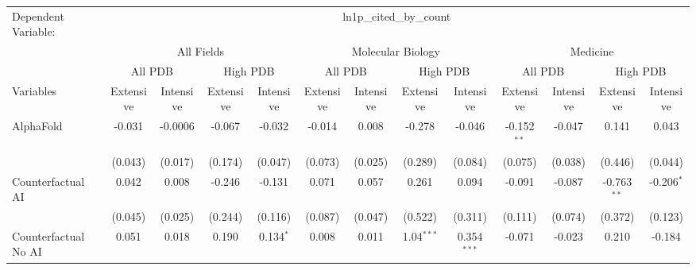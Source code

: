 \begingroup
\centering
\begin{tabular}{lcccccccccccc}
   \tabularnewline \midrule \midrule
   Dependent Variable: & \multicolumn{12}{c}{ln1p\_cited\_by\_count}\\
 & \multicolumn{4}{c}{All Fields} & \multicolumn{4}{c}{Molecular Biology} & \multicolumn{4}{c}{Medicine} \\
\cmidrule(lr){2-5} \cmidrule(lr){6-9} \cmidrule(lr){10-13}
 & \multicolumn{2}{c}{All PDB} & \multicolumn{2}{c}{High PDB} & \multicolumn{2}{c}{All PDB} & \multicolumn{2}{c}{High PDB} & \multicolumn{2}{c}{All PDB} & \multicolumn{2}{c}{High PDB} \\
\cmidrule(lr){2-3} \cmidrule(lr){4-5} \cmidrule(lr){6-7} \cmidrule(lr){8-9} \cmidrule(lr){10-11} \cmidrule(lr){12-13}
Variables & \multicolumn{1}{c}{Extensive} & \multicolumn{1}{c}{Intensive} & \multicolumn{1}{c}{Extensive} & \multicolumn{1}{c}{Intensive} & \multicolumn{1}{c}{Extensive} & \multicolumn{1}{c}{Intensive} & \multicolumn{1}{c}{Extensive} & \multicolumn{1}{c}{Intensive} & \multicolumn{1}{c}{Extensive} & \multicolumn{1}{c}{Intensive} & \multicolumn{1}{c}{Extensive} & \multicolumn{1}{c}{Intensive} \\
\cmidrule(lr){1-1}\cmidrule(lr){2-2} \cmidrule(lr){3-3} \cmidrule(lr){4-4} \cmidrule(lr){5-5} \cmidrule(lr){6-6} \cmidrule(lr){7-7} \cmidrule(lr){8-8} \cmidrule(lr){9-9} \cmidrule(lr){10-10} \cmidrule(lr){11-11} \cmidrule(lr){12-12} \cmidrule(lr){13-13}
   AlphaFold                                & -0.031  & -0.0006 & -0.067  & -0.032      & -0.014  & 0.008   & -0.278       & -0.046        & -0.152$^{**}$ & -0.047       & 0.141         & 0.043\\   
                                            & (0.043) & (0.017) & (0.174) & (0.047)     & (0.073) & (0.025) & (0.289)      & (0.084)       & (0.075)       & (0.038)      & (0.446)       & (0.044)\\   
   Counterfactual AI                        & 0.042   & 0.008   & -0.246  & -0.131      & 0.071   & 0.057   & 0.261        & 0.094         & -0.091        & -0.087       & -0.763$^{**}$ & -0.206$^{*}$\\   
                                            & (0.045) & (0.025) & (0.244) & (0.116)     & (0.087) & (0.047) & (0.522)      & (0.311)       & (0.111)       & (0.074)      & (0.372)       & (0.123)\\   
   Counterfactual No AI                     & 0.051   & 0.018   & 0.190   & 0.134$^{*}$ & 0.008   & 0.011   & 1.04$^{***}$ & 0.354$^{***}$ & -0.071        & -0.023       & 0.210         & -0.184\\   

\end{tabular}
